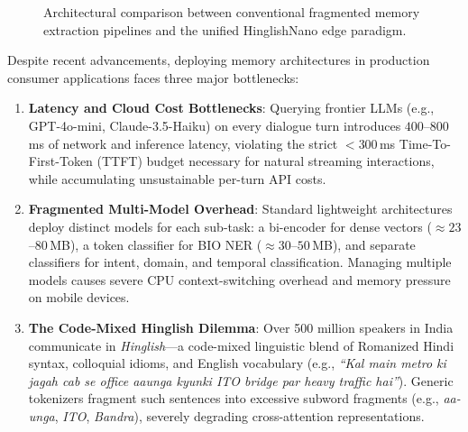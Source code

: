 \documentclass[11pt,a4paper]{article}
\begin{document}
\begin{figure}[htbp]
    \centering
    \caption{Architectural comparison between conventional fragmented memory extraction pipelines and the unified HinglishNano edge paradigm.}
    \label{fig:pipeline_comparison}
\end{figure}

Despite recent advancements, deploying memory architectures in production consumer applications faces three major bottlenecks:
\begin{enumerate}
    \item \textbf{Latency and Cloud Cost Bottlenecks}: Querying frontier LLMs (e.g., GPT-4o-mini, Claude-3.5-Haiku) on every dialogue turn introduces $400$--$800$\,ms of network and inference latency, violating the strict $<300$\,ms Time-To-First-Token (TTFT) budget necessary for natural streaming interactions, while accumulating unsustainable per-turn API costs.
    \item \textbf{Fragmented Multi-Model Overhead}: Standard lightweight architectures deploy distinct models for each sub-task: a bi-encoder for dense vectors ($\approx 23$--$80$\,MB), a token classifier for BIO NER ($\approx 30$--$50$\,MB), and separate classifiers for intent, domain, and temporal classification. Managing multiple models causes severe CPU context-switching overhead and memory pressure on mobile devices.
    \item \textbf{The Code-Mixed Hinglish Dilemma}: Over 500 million speakers in India communicate in \textit{Hinglish}---a code-mixed linguistic blend of Romanized Hindi syntax, colloquial idioms, and English vocabulary (e.g., \textit{``Kal main metro ki jagah cab se office aaunga kyunki ITO bridge par heavy traffic hai''}). Generic tokenizers fragment such sentences into excessive subword fragments (e.g., \textit{aa-unga}, \textit{ITO}, \textit{Bandra}), severely degrading cross-attention representations.
\end{enumerate}
\end{document}
